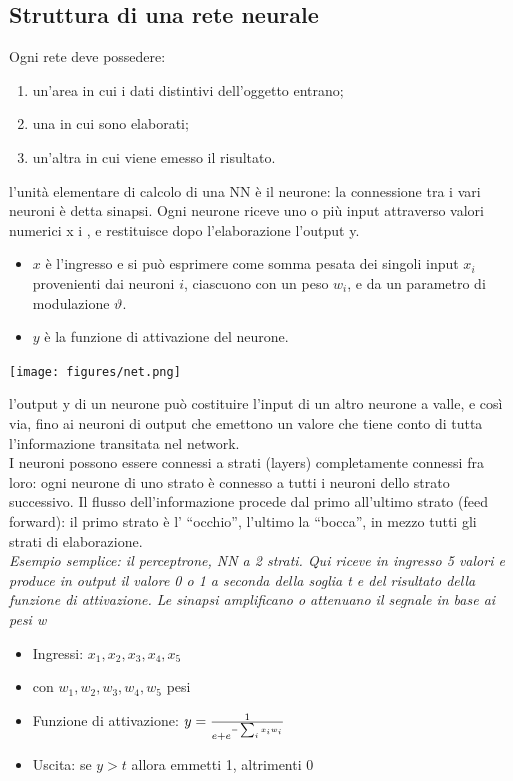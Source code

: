 \documentclass{article}
\begin{document}
\subsection{Struttura di una rete neurale}
Ogni rete deve possedere:
\begin{enumerate}
    \item un'area in cui i dati distintivi
    dell'oggetto entrano;
    \item una in cui sono elaborati;
    \item un'altra in
    cui viene emesso il risultato.
\end{enumerate}
l'unità elementare di calcolo di una NN è il neurone: la
connessione tra i vari neuroni è detta sinapsi. Ogni neurone
riceve uno o più input attraverso valori numerici x i , e restituisce
dopo l'elaborazione l'output y.
\begin{itemize}
    \item $x$ è l'ingresso e si può esprimere
    come somma pesata dei singoli
    input $x_{i}$ provenienti dai neuroni $i$, ciascuono con un peso $w_i$, e da un parametro di modulazione $\vartheta$.
    \item $y$ è la funzione di attivazione del
    neurone.
\end{itemize}
\begin{center}
    \texttt{[image: figures/net.png]}
\end{center}
l'output y di un neurone può costituire l'input di un altro neurone a
valle, e così via, fino ai neuroni di output che emettono un valore che
tiene conto di tutta l'informazione transitata nel network.\\
I neuroni possono essere connessi a strati (layers) completamente
connessi fra loro: ogni neurone di uno strato è connesso a tutti i
neuroni dello strato successivo. Il flusso dell'informazione procede dal
primo all'ultimo strato (feed forward): il primo strato è l' “occhio”,
l'ultimo la “bocca”, in mezzo tutti gli strati di elaborazione.\\
\textit{Esempio semplice: il perceptrone, NN a 2 strati. Qui riceve in ingresso 5
valori e produce in output il valore 0 o 1 a seconda della
soglia t e del risultato della funzione di attivazione. Le
sinapsi amplificano o attenuano il segnale in base ai pesi w}
\begin{itemize}
    \item Ingressi: $x_1, x_2, x_3, x_4, x_5$
    \item con $w_1, w_2, w_3, w_4, w_5$ pesi
    \item Funzione di attivazione: $y = {1\over e + e^{-\sum_i x_iw_i}}$
    \item Uscita: se $y>t$ allora emmetti 1, altrimenti 0
\end{itemize}
\end{document}
